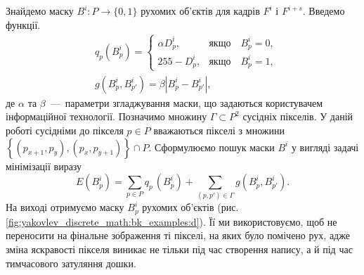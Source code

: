 Знайдемо маску $B^{i}:P \rightarrow \{0,1\}$ рухомих
об'єктів для кадрів \(F^{i}\) і \(F^{i + s}\).
Введемо функції.
\begin{align*}
	 & q_{p}(B_{p}^{i}) =
	\begin{cases}
		\alpha D_{p}^{i}, & \textit{якщо} \quad B_{p}^{i} = 0,  \\
		255 - D_{p}^{i},  & \textit{якщо} \quad B_{p}^{i} = 1 ,
	\end{cases}     \\
	 & g(B_{p}^{i},B_{p'}^{i}) = \beta|B_{p}^{i} - B_{p'}^{i}|,
\end{align*}
де \(\alpha\) та \(\beta\)~---~параметри згладжування маски, що задаються
користувачем інформаційної технології. Позначимо множину
$\Gamma \subset P^{2}$ сусідніх пікселів. У даній роботі сусідніми до
пікселя \(p \in P\) вважаються пікселі з множини
\(\left\{ \left( p_{x + 1},p_{y} \right),\left( p_{x},p_{y + 1} \right) \right\} \cap P\).
Сформулюємо пошук маски \(B^{i}\) у вигляді задачі мінімізації виразу
\begin{equation*}
	E\left( B_{p}^{i} \right) = \sum_{p \in P}^{}{q_{{p\ }}( B_{p}^{i}) +}\sum_{(p,p') \in \Gamma}^{}g(B_{p}^{i},B_{p'}^{i}).
\end{equation*}
На виході отримуємо маску \(B_{p}^{i}\) рухомих об'єктів (рис.
\ref{fig:yakovlev_discrete_math:bk_examples:d}).
Її ми використовуємо, щоб не переносити на фінальне зображення ті
пікселі, на яких було помічено рух, адже зміна яскравості пікселя
виникає не тільки під час створення напису, а й під час тимчасового
затуляння дошки.
